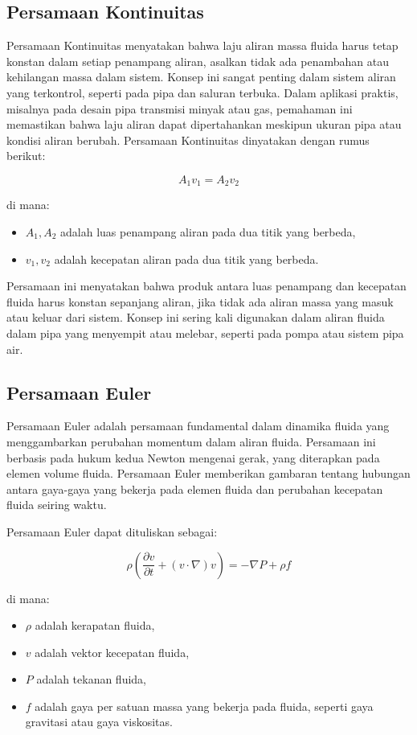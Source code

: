 \subsection{Persamaan Kontinuitas}
\label{subsubsec:persamaankontinuitas}

Persamaan Kontinuitas menyatakan bahwa laju aliran massa fluida harus tetap konstan dalam setiap penampang aliran, asalkan tidak ada penambahan atau kehilangan massa dalam sistem. Konsep ini sangat penting dalam sistem aliran yang terkontrol, seperti pada pipa dan saluran terbuka. Dalam aplikasi praktis, misalnya pada desain pipa transmisi minyak atau gas, pemahaman ini memastikan bahwa laju aliran dapat dipertahankan meskipun ukuran pipa atau kondisi aliran berubah. Persamaan Kontinuitas dinyatakan dengan rumus berikut:

\[
A_1 v_1 = A_2 v_2
\]

di mana:
\begin{itemize}
    \item $A_1, A_2$ adalah luas penampang aliran pada dua titik yang berbeda,
    \item $v_1, v_2$ adalah kecepatan aliran pada dua titik yang berbeda.
\end{itemize}

Persamaan ini menyatakan bahwa produk antara luas penampang dan kecepatan fluida harus konstan sepanjang aliran, jika tidak ada aliran massa yang masuk atau keluar dari sistem. Konsep ini sering kali digunakan dalam aliran fluida dalam pipa yang menyempit atau melebar, seperti pada pompa atau sistem pipa air.

\subsection{Persamaan Euler}
\label{subsubsec:persamaaneuler}

Persamaan Euler adalah persamaan fundamental dalam dinamika fluida yang menggambarkan perubahan momentum dalam aliran fluida. Persamaan ini berbasis pada hukum kedua Newton mengenai gerak, yang diterapkan pada elemen volume fluida. Persamaan Euler memberikan gambaran tentang hubungan antara gaya-gaya yang bekerja pada elemen fluida dan perubahan kecepatan fluida seiring waktu.

Persamaan Euler dapat dituliskan sebagai:

\[
\rho \left( \frac{\partial v}{\partial t} + (v \cdot \nabla)v \right) = - \nabla P + \rho f
\]

di mana:
\begin{itemize}
    \item $\rho$ adalah kerapatan fluida,
    \item $v$ adalah vektor kecepatan fluida,
    \item $P$ adalah tekanan fluida,
    \item $f$ adalah gaya per satuan massa yang bekerja pada fluida, seperti gaya gravitasi atau gaya viskositas.
\end{itemize}

